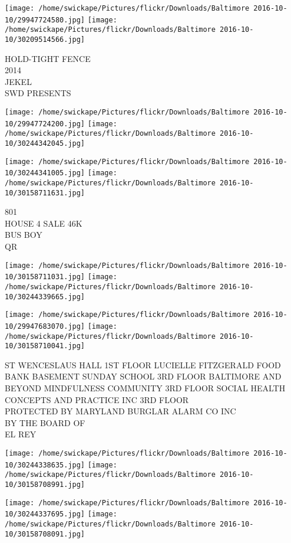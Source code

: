 \documentclass[10pt,letterpaper]{article}
\begin{document}
\texttt{[image: /home/swickape/Pictures/flickr/Downloads/Baltimore 2016-10-10/29947724580.jpg]}
\texttt{[image: /home/swickape/Pictures/flickr/Downloads/Baltimore 2016-10-10/30209514566.jpg]}

HOLD{-}TIGHT FENCE\\
2014\\
JEKEL\\
SWD PRESENTS\\
\pagebreak

\texttt{[image: /home/swickape/Pictures/flickr/Downloads/Baltimore 2016-10-10/29947724200.jpg]}
\texttt{[image: /home/swickape/Pictures/flickr/Downloads/Baltimore 2016-10-10/30244342045.jpg]}

\texttt{[image: /home/swickape/Pictures/flickr/Downloads/Baltimore 2016-10-10/30244341005.jpg]}
\texttt{[image: /home/swickape/Pictures/flickr/Downloads/Baltimore 2016-10-10/30158711631.jpg]}

801\\
HOUSE 4 SALE 46K\\
BUS BOY\\
QR\\
\pagebreak

\texttt{[image: /home/swickape/Pictures/flickr/Downloads/Baltimore 2016-10-10/30158711031.jpg]}
\texttt{[image: /home/swickape/Pictures/flickr/Downloads/Baltimore 2016-10-10/30244339665.jpg]}

\texttt{[image: /home/swickape/Pictures/flickr/Downloads/Baltimore 2016-10-10/29947683070.jpg]}
\texttt{[image: /home/swickape/Pictures/flickr/Downloads/Baltimore 2016-10-10/30158710041.jpg]}

ST WENCESLAUS HALL 1ST FLOOR LUCIELLE FITZGERALD FOOD BANK BASEMENT SUNDAY SCHOOL 3RD FLOOR BALTIMORE AND BEYOND MINDFULNESS COMMUNITY 3RD FLOOR SOCIAL HEALTH CONCEPTS AND PRACTICE INC 3RD FLOOR\\
PROTECTED BY MARYLAND BURGLAR ALARM CO INC\\
BY THE BOARD OF\\
EL REY\\
\pagebreak

\texttt{[image: /home/swickape/Pictures/flickr/Downloads/Baltimore 2016-10-10/30244338635.jpg]}
\texttt{[image: /home/swickape/Pictures/flickr/Downloads/Baltimore 2016-10-10/30158708991.jpg]}

\texttt{[image: /home/swickape/Pictures/flickr/Downloads/Baltimore 2016-10-10/30244337695.jpg]}
\texttt{[image: /home/swickape/Pictures/flickr/Downloads/Baltimore 2016-10-10/30158708091.jpg]}
\end{document}
